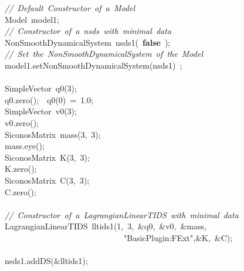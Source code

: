 {\ttfamily \raggedright \small
\ \ \textsl{//\ Default\ Constructor\ of\ a\ Model}\\
\ \ Model\ model1;\ \\
\ \ \textsl{//\ Constructor\ of\ a\ nsds\ with\ minimal\ data\ }\\
\ \ NonSmoothDynamicalSystem\ nsds1(\ \textbf{false}\ );\\
\ \ \textsl{//\ Set\ the\ NonSmoothDynamicalSystem\ of\ the\ Model}\\
\ \ model1.setNonSmoothDynamicalSystem(nsds1)\ ;\\
\ \ \ \ \ \ \ \ \\
\ \ SimpleVector\ q0(3);\\
\ \ q0.zero();\ \ q0(0)\ =\ 1.0;\ \ \ \ \ \ \ \ \ \ \ \ \ \ \ \ \\
\ \ SimpleVector\ v0(3);\\
\ \ v0.zero();\ \ \ \ \ \ \ \ \ \ \ \ \ \\
\ \ SiconosMatrix\ mass(3,\ 3);\\
\ \ mass.eye();\\
\ \ SiconosMatrix\ K(3,\ 3);\\
\ \ K.zero();\ \ \ \ \ \ \ \ \ \ \ \ \ \ \ \ \\
\ \ SiconosMatrix\ C(3,\ 3);\\
\ \ C.zero();\\
\ \\
\ \ \textsl{//\ Constructor\ of\ a\ LagrangianLinearTIDS\ with\ minimal\ data\ }\\
\ \ LagrangianLinearTIDS\ lltids1(1,\ 3,\ \&q0,\ \&v0,\ \&mass,\\
\ \ \ \ \ \ \ \ \ \ \ \ \ \ \ \ \ \ \ \ \ \ \ \ \ \ \ \ \ \ \ "{}BasicPlugin:FExt"{},\&K,\ \&C);\\
\ \\
\ \ nsds1.addDS(\&lltids1);\\
\ \\
 }
\normalfont\normalsize

